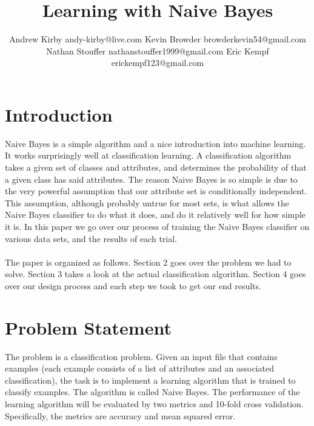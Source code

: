 \documentclass[twoside,11pt]{article}
\begin{document}
\title{Learning with Naive Bayes}

\author{\name Andrew Kirby \email andy-kirby@live.com \AND
		\name Kevin Browder \email browderkevin54@gmail.com \AND
		\name Nathan Stouffer \email nathanstouffer1999@gmail.com \AND
		\name Eric Kempf \email erickempf123@gmail.com }
	
\maketitle

\begin{abstract}
	
\end{abstract}

\section{Introduction}

Naive Bayes is a simple algorithm and a nice introduction into machine learning. It works surprisingly well at classification learning. A classification algorithm takes a given set of classes and attributes, and determines the probability of that a given class has said attributes. The reason Naive Bayes is so simple is due to the very powerful assumption that our attribute set is conditionally independent. This assumption, although probably untrue for most sets, is what allows the Naive Bayes classifier to do what it does, and do it relatively well for how simple it is. In this paper we go over our process of training the Naive Bayes classifier on various data sets, and the results of each trial. \\\\
The paper is organized as follows. Section 2 goes over the problem we had to solve. Section 3 takes a look at the actual classification algorithm. Section 4 goes over our design process and each step we took to get our end results.

\section{Problem Statement}

The problem is a classification problem. Given an input file that contains examples (each example consists of a list of attributes and an associated classification), the task is to implement a learning algorithm that is trained to classify examples. The algorithm is called Naive Bayes. The performance of the learning algorithm will be evaluated by two metrics and 10-fold cross validation. Specifically, the metrics are accuracy and mean squared error. 
\end{document}
